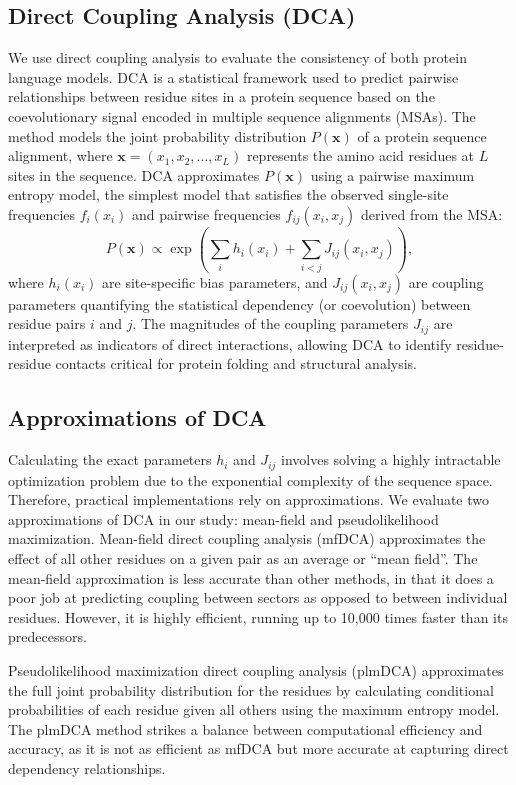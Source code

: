 \documentclass{article}
\begin{document}
\subsection{Direct Coupling Analysis (DCA)}
We use direct coupling analysis to evaluate the consistency of both protein language models. DCA is a statistical framework used to predict pairwise relationships between residue sites in a protein sequence based on the coevolutionary signal encoded in multiple sequence alignments (MSAs). The method models the joint probability distribution \( P(\mathbf{x}) \) of a protein sequence alignment, where \( \mathbf{x} = (x_1, x_2, \ldots, x_L) \) represents the amino acid residues at \( L \) sites in the sequence. DCA approximates \( P(\mathbf{x}) \) using a pairwise maximum entropy model, the simplest model that satisfies the observed single-site frequencies \( f_i(x_i) \) and pairwise frequencies \( f_{ij}(x_i, x_j) \) derived from the MSA:  
\[
P(\mathbf{x}) \propto \exp\left(\sum_{i} h_i(x_i) + \sum_{i<j} J_{ij}(x_i, x_j)\right),
\]  
where \( h_i(x_i) \) are site-specific bias parameters, and \( J_{ij}(x_i, x_j) \) are coupling parameters quantifying the statistical dependency (or coevolution) between residue pairs \( i \) and \( j \). The magnitudes of the coupling parameters \( J_{ij} \) are interpreted as indicators of direct interactions, allowing DCA to identify residue-residue contacts critical for protein folding and structural analysis. 

\subsection{Approximations of DCA}

Calculating the exact parameters \( h_i \) and \( J_{ij} \) involves solving a highly intractable optimization problem due to the exponential complexity of the sequence space. Therefore, practical implementations rely on approximations. We evaluate two approximations of DCA in our study: mean-field and pseudolikelihood maximization. Mean-field direct coupling analysis (mfDCA) approximates the effect of all other residues on a given pair as an average or ``mean field''. The mean-field approximation is less accurate than other methods, in that it does a poor job at predicting coupling between sectors as opposed to between individual residues. However, it is highly efficient, running up to 10,000 times faster than its predecessors.

Pseudolikelihood maximization direct coupling analysis (plmDCA) approximates the full joint probability distribution for the residues by calculating conditional probabilities of each residue given all others using the maximum entropy model. The plmDCA method strikes a balance between computational efficiency and accuracy, as it is not as efficient as mfDCA but more accurate at capturing direct dependency relationships.
\end{document}

